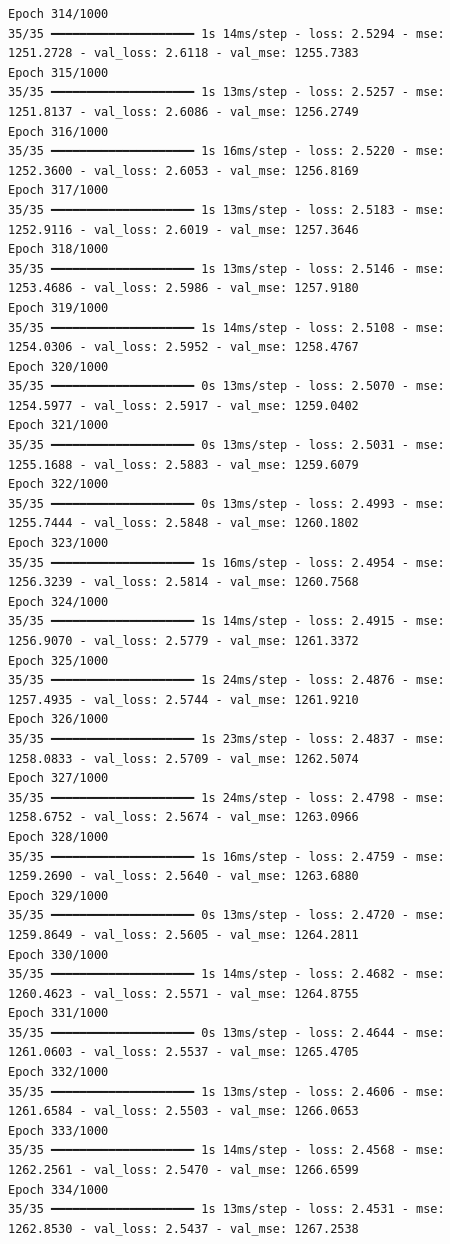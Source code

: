 \documentclass[
  letterpaper,
  DIV=11,
  numbers=noendperiod]{scrreprt}
\begin{document}
\begin{verbatim}
Epoch 314/1000
35/35 ━━━━━━━━━━━━━━━━━━━━ 1s 14ms/step - loss: 2.5294 - mse: 1251.2728 - val_loss: 2.6118 - val_mse: 1255.7383
Epoch 315/1000
35/35 ━━━━━━━━━━━━━━━━━━━━ 1s 13ms/step - loss: 2.5257 - mse: 1251.8137 - val_loss: 2.6086 - val_mse: 1256.2749
Epoch 316/1000
35/35 ━━━━━━━━━━━━━━━━━━━━ 1s 16ms/step - loss: 2.5220 - mse: 1252.3600 - val_loss: 2.6053 - val_mse: 1256.8169
Epoch 317/1000
35/35 ━━━━━━━━━━━━━━━━━━━━ 1s 13ms/step - loss: 2.5183 - mse: 1252.9116 - val_loss: 2.6019 - val_mse: 1257.3646
Epoch 318/1000
35/35 ━━━━━━━━━━━━━━━━━━━━ 1s 13ms/step - loss: 2.5146 - mse: 1253.4686 - val_loss: 2.5986 - val_mse: 1257.9180
Epoch 319/1000
35/35 ━━━━━━━━━━━━━━━━━━━━ 1s 14ms/step - loss: 2.5108 - mse: 1254.0306 - val_loss: 2.5952 - val_mse: 1258.4767
Epoch 320/1000
35/35 ━━━━━━━━━━━━━━━━━━━━ 0s 13ms/step - loss: 2.5070 - mse: 1254.5977 - val_loss: 2.5917 - val_mse: 1259.0402
Epoch 321/1000
35/35 ━━━━━━━━━━━━━━━━━━━━ 0s 13ms/step - loss: 2.5031 - mse: 1255.1688 - val_loss: 2.5883 - val_mse: 1259.6079
Epoch 322/1000
35/35 ━━━━━━━━━━━━━━━━━━━━ 0s 13ms/step - loss: 2.4993 - mse: 1255.7444 - val_loss: 2.5848 - val_mse: 1260.1802
Epoch 323/1000
35/35 ━━━━━━━━━━━━━━━━━━━━ 1s 16ms/step - loss: 2.4954 - mse: 1256.3239 - val_loss: 2.5814 - val_mse: 1260.7568
Epoch 324/1000
35/35 ━━━━━━━━━━━━━━━━━━━━ 1s 14ms/step - loss: 2.4915 - mse: 1256.9070 - val_loss: 2.5779 - val_mse: 1261.3372
Epoch 325/1000
35/35 ━━━━━━━━━━━━━━━━━━━━ 1s 24ms/step - loss: 2.4876 - mse: 1257.4935 - val_loss: 2.5744 - val_mse: 1261.9210
Epoch 326/1000
35/35 ━━━━━━━━━━━━━━━━━━━━ 1s 23ms/step - loss: 2.4837 - mse: 1258.0833 - val_loss: 2.5709 - val_mse: 1262.5074
Epoch 327/1000
35/35 ━━━━━━━━━━━━━━━━━━━━ 1s 24ms/step - loss: 2.4798 - mse: 1258.6752 - val_loss: 2.5674 - val_mse: 1263.0966
Epoch 328/1000
35/35 ━━━━━━━━━━━━━━━━━━━━ 1s 16ms/step - loss: 2.4759 - mse: 1259.2690 - val_loss: 2.5640 - val_mse: 1263.6880
Epoch 329/1000
35/35 ━━━━━━━━━━━━━━━━━━━━ 0s 13ms/step - loss: 2.4720 - mse: 1259.8649 - val_loss: 2.5605 - val_mse: 1264.2811
Epoch 330/1000
35/35 ━━━━━━━━━━━━━━━━━━━━ 1s 14ms/step - loss: 2.4682 - mse: 1260.4623 - val_loss: 2.5571 - val_mse: 1264.8755
Epoch 331/1000
35/35 ━━━━━━━━━━━━━━━━━━━━ 0s 13ms/step - loss: 2.4644 - mse: 1261.0603 - val_loss: 2.5537 - val_mse: 1265.4705
Epoch 332/1000
35/35 ━━━━━━━━━━━━━━━━━━━━ 1s 13ms/step - loss: 2.4606 - mse: 1261.6584 - val_loss: 2.5503 - val_mse: 1266.0653
Epoch 333/1000
35/35 ━━━━━━━━━━━━━━━━━━━━ 1s 14ms/step - loss: 2.4568 - mse: 1262.2561 - val_loss: 2.5470 - val_mse: 1266.6599
Epoch 334/1000
35/35 ━━━━━━━━━━━━━━━━━━━━ 1s 13ms/step - loss: 2.4531 - mse: 1262.8530 - val_loss: 2.5437 - val_mse: 1267.2538

\end{verbatim}
\end{document}
